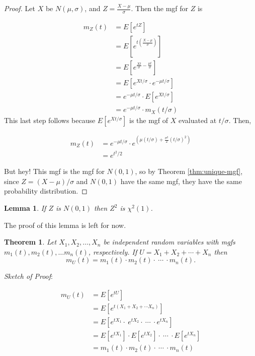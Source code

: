 \documentclass[
]{book}
\newtheorem{theorem}{Theorem}[chapter]
\newtheorem{lemma}{Lemma}[chapter]
\theoremstyle{definition}
\theoremstyle{definition}
\theoremstyle{definition}
\theoremstyle{definition}
\theoremstyle{remark}
\begin{document}
\begin{proof}
Let \(X\) be \(N(\mu,\sigma)\), and \(Z = \frac{X-\mu}{\sigma}\). Then the mgf for \(Z\) is

\begin{align*}
m_Z(t) &= E\left[e^{tZ}\right]\\
      &= E\left[e^{t\left(\frac{X-\mu}{\sigma}\right)}\right]\\
      &= E\left[e^{\frac{Xt}{\sigma} - \frac{\mu t}{\sigma}}\right]\\
      &= E\left[e^{Xt/\sigma} \cdot e^{-\mu t/\sigma}\right] \\
      &= e^{-\mu t/\sigma}\cdot E\left[e^{Xt/\sigma}\right]\\
      &= e^{-\mu t/\sigma}\cdot m_X(t/\sigma)
\end{align*}
This last step follows because \(\displaystyle E\left[e^{Xt/\sigma}\right]\) is the mgf of \(X\) evaluated at \(t/\sigma\). Then,

\begin{align*}
m_Z(t) &= e^{-\mu t/\sigma}\cdot e^{\left(\mu (t/\sigma) + \frac{\sigma^2}{2}(t/\sigma)^2\right)} \\
      &= e^{t^2/2}
\end{align*}

But hey! This mgf is the mgf for \(N(0,1)\), so by Theorem \ref{thm:unique-mgf}, since \(Z = (X-\mu)/\sigma\) and \(N(0,1)\) have the same mgf, they have the same probability distribution.
\end{proof}

\begin{lemma}
\protect\hypertarget{lem:Z-square-is-chi-square}{}\label{lem:Z-square-is-chi-square}If \(Z\) is \(N(0,1)\) then \(Z^2\) is \(\chi^2(1)\).
\end{lemma}

The proof of this lemma is left for now.

\begin{theorem}
\protect\hypertarget{thm:mgf-sum-of-rvs}{}\label{thm:mgf-sum-of-rvs}Let \(X_1, X_2, \ldots, X_n\) be independent random variables with mgfs \(m_1(t), m_2(t), \ldots m_n(t)\), respectively. If \(U = X_1 + X_2 + \cdots + X_n\) then \[m_U(t) = m_1(t) \cdot m_2(t) \cdot ~\cdots~ \cdot m_n(t).\]
\end{theorem}

\emph{Sketch of Proof}:

\begin{align*}
m_U(t) &= E\left[e^{tU}\right]\\
      &= E\left[e^{t(X_1 + X_2 + \cdots X_n)}\right]\\
      &= E\left[e^{tX_1}\cdot\ e^{tX_2} \cdot ~\cdots~ \cdot e^{tX_n}\right]\\
      &= E\left[e^{tX_1}\right] \cdot E\left[e^{tX_2}\right] \cdot ~\cdots~ \cdot E\left[e^{tX_n}\right]\\
      &= m_1(t) \cdot m_2(t) \cdot ~\cdots~ \cdot m_n(t)
\end{align*}
\end{document}
